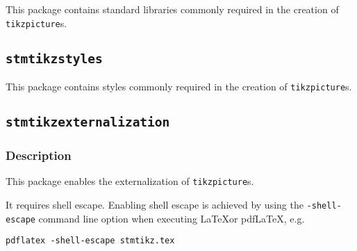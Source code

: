 \documentclass{scrartcl}
\begin{document}

This package contains standard libraries commonly required in the creation of \texttt{tikzpicture}s.


\subsection{\protect\texttt{stmtikzstyles}}
\label{sec:usage:preamble:styles}


This package contains styles commonly required in the creation of \texttt{tikzpicture}s.


\subsection{\protect\texttt{stmtikzexternalization}}
\label{sec:usage:preamble:externalization}

\subsubsection{Description}
\label{sec:usage:preamble:externalization:description}

This package enables the externalization of \texttt{tikzpicture}s.

It requires shell escape. Enabling shell escape is achieved by using the \verb+-shell-escape+ command line option when executing \LaTeX or pdf\LaTeX, e.g.

\begin{verbatim}
pdflatex -shell-escape stmtikz.tex
\end{verbatim}
\end{document}
